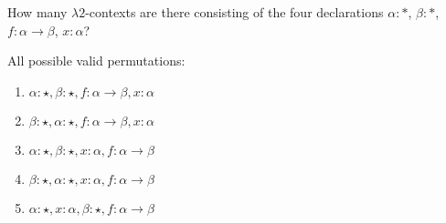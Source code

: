 \begin{problem}{3.1}
    How many $\lambda 2$-contexts are there consisting of the four declarations $\alpha:*$, $\beta:*$, $f:\alpha\rightarrow\beta$, $x:\alpha$?
\end{problem}

\begin{solution}
    All possible valid permutations:
    \begin{enumerate}
        \item $\alpha:\star, \beta:\star, f:\alpha \to \beta, x:\alpha$
        \item $\beta:\star, \alpha:\star, f:\alpha \to \beta, x:\alpha$
        \item $\alpha:\star, \beta:\star, x:\alpha, f:\alpha \to \beta$
        \item $\beta:\star, \alpha:\star, x:\alpha, f:\alpha \to \beta$
        \item $\alpha : \star, x:\alpha, \beta:\star, f:\alpha \to \beta$
    \end{enumerate}
\end{solution}